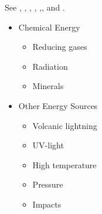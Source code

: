 \documentclass[]{article}
\begin{document}
See \cite{kitadai2018origins}, \cite{stueken2013did}, \cite{damer2016field}, \cite{miller1959organic}, \cite{ehrenfreund2002astrophysical},\cite{dalai2016incubating}, and \cite{chyba1997comets}.

\begin{itemize}
	\item Chemical Energy
	\begin{itemize}
		\item Reducing gases
		\item Radiation
		\item Minerals
	\end{itemize}
	\item Other Energy Sources
	\begin{itemize}
		\item Volcanic lightning
		\item UV-light
		\item High temperature
		\item Pressure
		\item Impacts
	\end{itemize}
\end{itemize}
\end{document}
